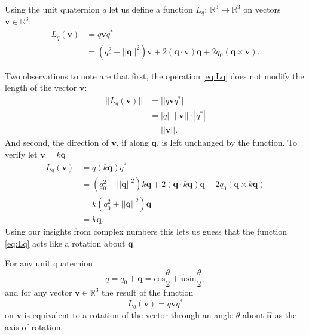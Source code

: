 Using the unit quaternion $q$ let us define a function $L_q:~\mathbb{R}^3 \rightarrow \mathbb{R}^3$ on vectors $\textbf{v} \in \mathbb{R}^3
$:
\begin{align}
L_q(\textbf{v}) &= q\textbf{v}q^* \nonumber \\
&= (q_0^2 - ||\textbf{q}||^2)\textbf{v} + 2(\textbf{q}\cdot\textbf{v})\textbf{q} + 2q_0(\textbf{q} \times \textbf{v}). 
\label{eq:Lq}
\end{align}

Two observations to note are that first, the operation \eqref{eq:Lq} does not modify the length of the vector $\textbf{v}$:
\begin{align*}
||L_q(\textbf{v})|| &= ||q\textbf{v}q^*||  \\
&= |q| \cdot ||\textbf{v}|| \cdot |q^*| \\
&= ||\textbf{v}||. 
\end{align*}
And second, the direction of $\textbf{v}$, if along $\textbf{q}$, is left unchanged by the function. To verify let $\textbf{v} = k\textbf{q}$
\begin{align*}
L_q(\textbf{v}) &= q(k\textbf{q})q^*  \\
&= (q_0^2 - ||\textbf{q}||^2)k\textbf{q} + 2(\textbf{q}\cdot k\textbf{q})\textbf{q} + 2q_0(\textbf{q} \times k\textbf{q}) \\
&= k(q_0^2 + ||\textbf{q}||^2)\textbf{q} \\
&= k\textbf{q}.
\end{align*}
Using our insights from complex numbers this lets us guess that the function \eqref{eq:Lq} acts like a rotation about $\textbf{q}$.

\begin{theorem}
For any unit quaternion
\begin{equation}
q = q_0 + \textbf{q} = \mbox{cos}\frac{\theta}{2} + \mathbf{\hat{u}}\mbox{sin}\frac{\theta}{2},
\label{eq:unitquat}
\end{equation}
and for any vector $\textbf{v} \in \mathbb{R}^3$ the result of the function
\begin{equation*}
L_q(\textbf{v}) = q\textbf{v}q^*
\end{equation*}
on $\textbf{v}$ is equivalent to a rotation of the vector through an angle $\theta$ about $\mathbf{\hat{u}}$ as the axis of rotation.
\end{theorem}

